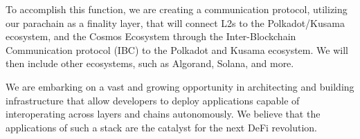 To accomplish this function, we are creating a communication protocol, utilizing our parachain as a finality layer, that will connect L2s to the Polkadot/Kusama ecosystem, and the Cosmos Ecosystem through the Inter-Blockchain Communication protocol (IBC)\cite{Inter-BlockchainCommunication} to the Polkadot and Kusama ecosystem. We will then include other ecosystems, such as Algorand,\cite{AlgorandAlgorand} Solana,\cite{ScalableScale} and more.

We are embarking on a vast and growing opportunity in architecting and building infrastructure that allow developers to deploy applications capable of interoperating across layers and chains autonomously. We believe that the applications of such a stack are the catalyst for the next DeFi revolution.
